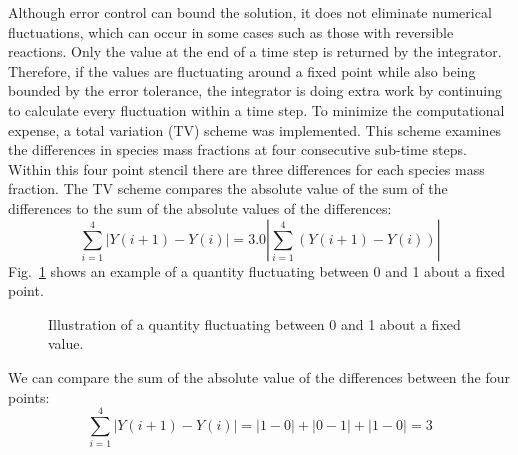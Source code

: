Although error control can bound the solution, it does not eliminate numerical fluctuations, which can occur in some cases such as those with reversible reactions. Only the value at the end of a time step is returned by the integrator. Therefore, if the values are fluctuating around a fixed point while also being bounded by the error tolerance, the integrator is doing extra work by continuing to calculate every fluctuation within a time step. To minimize the computational expense, a total variation (TV) scheme was implemented. This scheme examines the differences in species mass fractions at four consecutive sub-time steps. Within this four point stencil there are three differences for each species mass fraction. The TV scheme compares the absolute value of the sum of the differences to the sum of the absolute values of the differences: 
\begin{equation}\label{eq:TV}
\displaystyle \sum_{i=1}^{4}|Y(i+1)-Y(i)| = 3.0|\displaystyle \sum_{i=1}^{4}(Y(i+1)-Y(i))|
\end{equation}
Fig.~\ref{fig:TV} shows an example of a quantity fluctuating between 0 and 1 about a fixed point.
\begin{figure}[h!]
\begin{center}
\caption{\label{fig:TV} Illustration of a quantity fluctuating between 0 and 1 about a fixed value.}
\end{center}
\end{figure}
We can compare the sum of the absolute value of the differences between the four points:
\begin{equation}\label{eq:sum_abs_tv}
\displaystyle \sum_{i=1}^{4}|Y(i+1)-Y(i)| = |1-0| + |0-1| + |1-0| = 3
\end{equation}
